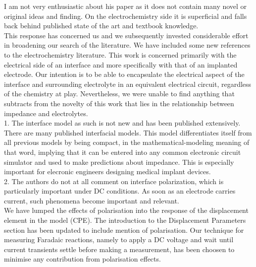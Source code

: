 \documentclass[journal, a4paper]{IEEEtran}
\begin{document}
{\color{blue}
I am not very enthusiastic about his paper as it does not contain many novel or original ideas and finding. On the electrochemistry side it is superficial and falls back behind published state of the art and textbook knowledge.\\
{\color{OliveGreen}
    This response has concerned us and we subsequently invested considerable effort in broadening our search of the literature. We have included some new references to the electrochemistry literature. This work is concerned primarily with the electrical side of an interface and more specifically with that of an implanted electrode. Our intention is to be able to encapsulate the electrical aspect of the interface and surrounding electrolyte in an equivalent electrical circuit, regardless of the chemistry at play.
Nevertheless, we were unable to find anything that subtracts from the novelty of this work that lies in the relationship between impedance and electrolytes. 
}\\

1. The interface model as such is not new and has been published extensively.\\
{\color{OliveGreen}
    There are many published interfacial models. This model differentiates itself from all previous models by being compact, in the mathematical-modeling meaning of that word, implying that it can be entered into any common electronic circuit simulator and used to make predictions about impedance. This is especially important for elecronic engineers designing medical implant devices.
}\\

2. The authors do not at all comment on interface polarization, which is particularly important under DC conditions. As soon as an electrode carries current, such phenomena become important and relevant.\\
{\color{OliveGreen}
    We have lumped the effects of polarisation into the response of the displacement element in the model (CPE). The introduction to the Displacement Parameters section has been updated to include mention of polarisation. Our technique for measuring Faradaic reactions, namely to apply a DC voltage and wait until current transients settle before making a measurement, has been choosen to minimise any contribution from polarisation effects.
}\\

}
\end{document}
